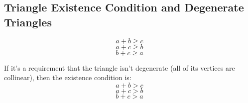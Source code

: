 \subsection{Triangle Existence Condition and Degenerate Triangles}
$$a + b \geq c$$
$$a + c \geq b$$
$$b + c \geq a$$

If it's a requirement that the triangle isn't degenerate (all of its vertices are collinear), then the existence condition is:
$$a + b > c$$
$$a + c > b$$
$$b + c > a$$

